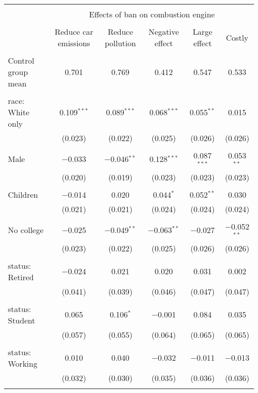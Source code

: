 
\begin{tabular}{@{\extracolsep{5pt}}lccccc} 
\\[-1.8ex]\hline 
\hline \\[-1.8ex] 
 & \multicolumn{5}{c}{Effects of ban on combustion engine} \\ 
\cline{2-6} 
\\[-1.8ex] & Reduce car emissions & Reduce pollution & Negative effect & Large effect & Costly \\ 
\hline \\[-1.8ex] 
 Control group mean & 0.701 & 0.769 & 0.412 & 0.547 & 0.533  \\ \hline \\[-1.8ex] race: White only & 0.109$^{***}$ & 0.089$^{***}$ & 0.068$^{***}$ & 0.055$^{**}$ & 0.015 \\ 
  & (0.023) & (0.022) & (0.025) & (0.026) & (0.026) \\ 
  & & & & & \\ 
 Male & $-$0.033 & $-$0.046$^{**}$ & 0.128$^{***}$ & 0.087$^{***}$ & 0.053$^{**}$ \\ 
  & (0.020) & (0.019) & (0.023) & (0.023) & (0.023) \\ 
  & & & & & \\ 
 Children & $-$0.014 & 0.020 & 0.044$^{*}$ & 0.052$^{**}$ & 0.030 \\ 
  & (0.021) & (0.021) & (0.024) & (0.024) & (0.024) \\ 
  & & & & & \\ 
 No college & $-$0.025 & $-$0.049$^{**}$ & $-$0.063$^{**}$ & $-$0.027 & $-$0.052$^{**}$ \\ 
  & (0.023) & (0.022) & (0.025) & (0.026) & (0.026) \\ 
  & & & & & \\ 
 status: Retired & $-$0.024 & 0.021 & 0.020 & 0.031 & 0.002 \\ 
  & (0.041) & (0.039) & (0.046) & (0.047) & (0.047) \\ 
  & & & & & \\ 
 status: Student & 0.065 & 0.106$^{*}$ & $-$0.001 & 0.084 & 0.035 \\ 
  & (0.057) & (0.055) & (0.064) & (0.065) & (0.065) \\ 
  & & & & & \\ 
 status: Working & 0.010 & 0.040 & $-$0.032 & $-$0.011 & $-$0.013 \\ 
  & (0.032) & (0.030) & (0.035) & (0.036) & (0.036) \\ 
  & & & & & \\ 

\end{tabular}

